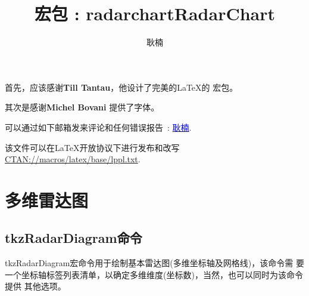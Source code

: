 \documentclass[DIV         = 12,
               fontsize    = 10,
               headinclude = false,
               index       = totoc,
               footinclude = false,
               twoside,
               headings    = small
               ]{tkz-doc}
\title{宏包 : radarchart}
\author{耿楠}
\gdef\nameofpack{RadarChart}
\begin{document}
\parindent=0pt   
\title{\nameofpack}
\date{\zhdate{\today}}

\clearpage
\thispagestyle{empty}
\maketitle

\clearpage
\tkzSetUpColors[background=fondpaille,text=Maroon]   
\pagecolor{fondpaille} 
\color{Maroon}   


\nameoffile{\nameofpack} 

\presentation

\vspace*{12pt}   

\tkzHand 首先，应该感谢\textbf{Till Tantau}，他设计了完美的\LaTeX 的
\TIKZ 宏包。

\vspace*{12pt}   
\tkzHand 其次是感谢\textbf{Michel Bovani} 提供了字体。



\vfill
可以通过如下邮箱发来评论和任何错误报告~:
\href{mailto:nangeng@qq.com}{\textcolor{blue}{耿楠}}.
 
该文件可以在\LaTeX 开放协议下进行发布和改写 \url{CTAN://macros/latex/base/lppl.txt}.    


\clearpage
\tableofcontents
 
\clearpage\newpage 
   
\setlength{\parskip}{1ex plus 0.5ex minus 0.2ex}
     
\newpage
\section{多维雷达图}
\subsection{tkzRadarDiagram命令} 
tkzRadarDiagram宏命令用于绘制基本雷达图(多维坐标轴及网格线)，该命令需
要一个坐标轴标签列表清单，以确定多维维度(坐标数)，当然，也可以同时为该命令提供
其他选项。
\end{document}
